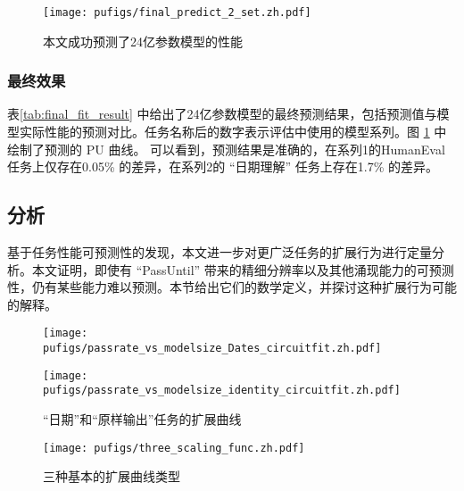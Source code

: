 \begin{figure}[!htbp]
    \centering
    \texttt{[image: pufigs/final\_predict\_2\_set.zh.pdf]}
    \caption{本文成功预测了24亿参数模型的性能}
    \label{fig:final_curve_humaneval_series1} 
\end{figure}


\subsubsection{最终效果}
\begin{table}[!htbp]
    \centering
    \caption{本文任务性能可预测方法的最终效果}
    \label{tab:final_fit_result}
\end{table}



表\ref{tab:final_fit_result} 中给出了24亿参数模型的最终预测结果，包括预测值与模型实际性能的预测对比。任务名称后的数字表示评估中使用的模型系列。图 \ref{fig:final_curve_humaneval_series1} 中绘制了预测的 \textsc{PU} 曲线。 可以看到，预测结果是准确的，在系列1的HumanEval任务上仅存在0.05\% 的差异，在系列2的 “日期理解” 任务上存在1.7\% 的差异。 


\subsection{分析}
\label{sec:emergent}

{基于任务性能可预测性的发现，本文进一步对更广泛任务的扩展行为进行定量分析。本文证明，即使有 “PassUntil” 带来的精细分辨率以及其他涌现能力的可预测性，仍有某些能力难以预测。本节给出它们的数学定义，并探讨这种扩展行为可能的解释。}
\begin{figure}
    \centering
        \centering
        \texttt{[image: pufigs/passrate\_vs\_modelsize\_Dates\_circuitfit.zh.pdf]}
        \centering
\end{figure}
\begin{figure}
        \texttt{[image: pufigs/passrate\_vs\_modelsize\_identity\_circuitfit.zh.pdf]}
        \caption{“日期”和“原样输出”任务的扩展曲线}
        \label{fig:unnatural}
\end{figure}
\begin{figure}
    \centering
    \texttt{[image: pufigs/three\_scaling\_func.zh.pdf]}
    \caption{三种基本的扩展曲线类型}
    \label{fig:threekindsofgrowth}
\end{figure}

